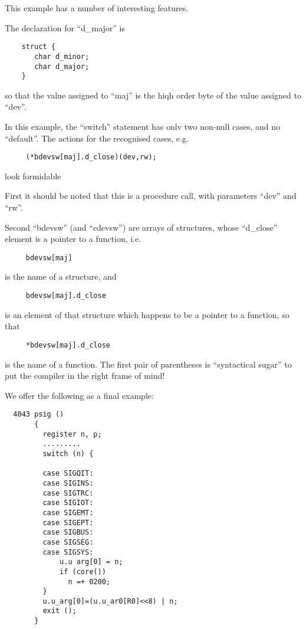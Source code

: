This example has a number of interesting features.

The declaration for ``d\_major'' is

\begin{verbatim}
    struct {
       char d_minor;
       char d_major;
    }
\end{verbatim}


\noindent so that the value assigned to ``maj''  is
the   hiqh  order  byte  of  the  value
assigned to ``dev''.


In this example, the ``switch'' statement
has  onlv  two  non-null  cases, and no
``default''.  The actions for the  recognised cases, e.g.

\begin{verbatim}
     (*bdevsw[maj].d_close)(dev,rw);
\end{verbatim}

\noindent look formidable


First it should be noted that this is a
procedure  call,  with parameters ``dev''
and ``rw''.

Second  ``bdevsw''  (and  ``cdevsw'')   are
arrays  of  structures, whose ``d\_close''
element is a  pointer  to  a  function,
i.e.

\begin{verbatim}
     bdevsw[maj]
\end{verbatim}

\noindent is the name of a structure, and

\begin{verbatim}
     bdevsw[maj].d_close
\end{verbatim}


\noindent is an element of that  structure  which
happens  to be a pointer to a function,
so that

\begin{verbatim}
     *bdevsw[maj].d_close
\end{verbatim}

\noindent is the name of a function.   The  first
pair  of  parentheses  is  ``syntactical
sugar'' to put the compiler in the right
frame of mind!


We offer the following as a final example:

\begin{verbatim}
  4043 psig ()
       {
         register n, p;
         .........
         switch (n) {

         case SIGQIT:
         case SIGINS:
         case SIGTRC:
         case SIGIOT:
         case SIGEMT:
         case SIGEPT:
         case SIGBUS:
         case SIGSEG:
         case SIGSYS:
             u.u arg[0] = n;
             if (core())
               n =+ 0200;
         }
         u.u_arg[0]=(u.u_ar0[R0]<<8) | n;
         exit ();
       }
\end{verbatim}

